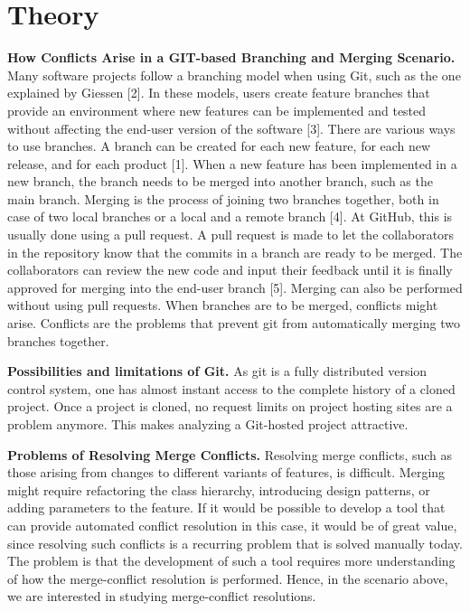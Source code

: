 \chapter{Theory}
\textbf{How Conflicts Arise in a GIT-based Branching and Merging Scenario.} Many software projects follow a branching model when using Git, such as the one explained by Giessen [2]. In these models, users create feature branches that provide an environment where new features can be implemented and tested without affecting the end-user version of the software [3]. There are various ways to use branches. A branch can be created for each new feature, for each new release, and for each product [1]. When a new feature has been implemented in a new branch, the branch needs to be merged into another branch, such as the main branch. Merging is the process of joining two branches together, both in case of two local branches or a local and a remote branch [4]. At GitHub, this is usually done using a pull request. A pull request is made to let the collaborators in the repository know that the commits in a branch are ready to be merged. The collaborators can review the new code and input their feedback until it is finally approved for merging into the end-user branch [5]. Merging can also be performed without using pull requests. When branches are to be merged, conflicts might arise. Conflicts are the problems that prevent git from automatically merging two branches together.

\textbf{Possibilities and limitations of Git.} As git is a fully distributed version control system, one has almost instant access to the complete history of a cloned project. Once a project is cloned, no request limits on project hosting sites are a problem anymore. This makes analyzing a Git-hosted project attractive.

\textbf{Problems of Resolving Merge Conflicts.} Resolving merge conflicts, such as those arising from changes to different variants of features, is difficult. Merging might require refactoring the class hierarchy, introducing design patterns, or adding parameters to the feature. If it would be possible to develop a tool that can provide automated conflict resolution in this case, it would be of great value, since resolving such conflicts is a recurring problem that is solved manually today. The problem is that the development of such a tool requires more understanding of how the merge-conflict resolution is performed. Hence, in the scenario above, we are interested in studying merge-conflict resolutions.

